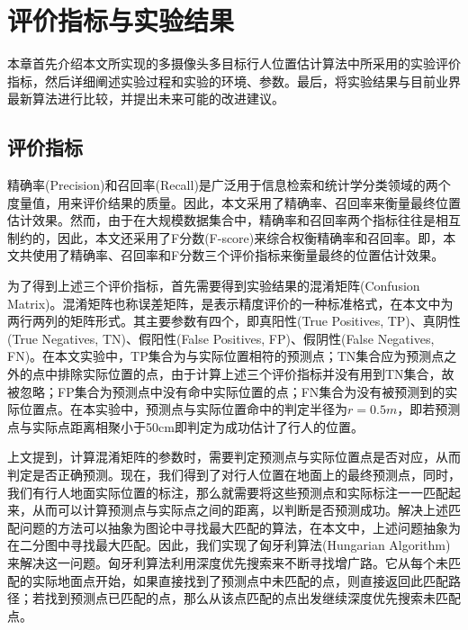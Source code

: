 
\chapter{评价指标与实验结果}

本章首先介绍本文所实现的多摄像头多目标行人位置估计算法中所采用的实验评价指标，然后详细阐述实验过程和实验的环境、参数。最后，将实验结果与目前业界最新算法进行比较，并提出未来可能的改进建议。

\section{评价指标}

精确率(Precision)和召回率(Recall)是广泛用于信息检索和统计学分类领域的两个度量值，用来评价结果的质量。因此，本文采用了精确率、召回率来衡量最终位置估计效果。然而，由于在大规模数据集合中，精确率和召回率两个指标往往是相互制约的，因此，本文还采用了F分数(F-score)来综合权衡精确率和召回率。即，本文共使用了精确率、召回率和F分数三个评价指标来衡量最终的位置估计效果。

为了得到上述三个评价指标，首先需要得到实验结果的混淆矩阵(Confusion Matrix)。混淆矩阵也称误差矩阵，是表示精度评价的一种标准格式，在本文中为两行两列的矩阵形式。其主要参数有四个，即真阳性(True Positives, TP)、真阴性(True Negatives, TN)、假阳性(False Positives, FP)、假阴性(False Negatives, FN)。在本文实验中，TP集合为与实际位置相符的预测点；TN集合应为预测点之外的点中排除实际位置的点，由于计算上述三个评价指标并没有用到TN集合，故被忽略；FP集合为预测点中没有命中实际位置的点；FN集合为没有被预测到的实际位置点。在本实验中，预测点与实际位置命中的判定半径为$r=0.5m$，即若预测点与实际点距离相聚小于50cm即判定为成功估计了行人的位置。

上文提到，计算混淆矩阵的参数时，需要判定预测点与实际位置点是否对应，从而判定是否正确预测。现在，我们得到了对行人位置在地面上的最终预测点，同时，我们有行人地面实际位置的标注，那么就需要将这些预测点和实际标注一一匹配起来，从而可以计算预测点与实际点之间的距离，以判断是否预测成功。解决上述匹配问题的方法可以抽象为图论中寻找最大匹配的算法，在本文中，上述问题抽象为在二分图中寻找最大匹配。因此，我们实现了匈牙利算法(Hungarian Algorithm)来解决这一问题。匈牙利算法利用深度优先搜索来不断寻找增广路。它从每个未匹配的实际地面点开始，如果直接找到了预测点中未匹配的点，则直接返回此匹配路径；若找到预测点已匹配的点，那么从该点匹配的点出发继续深度优先搜索未匹配点。

